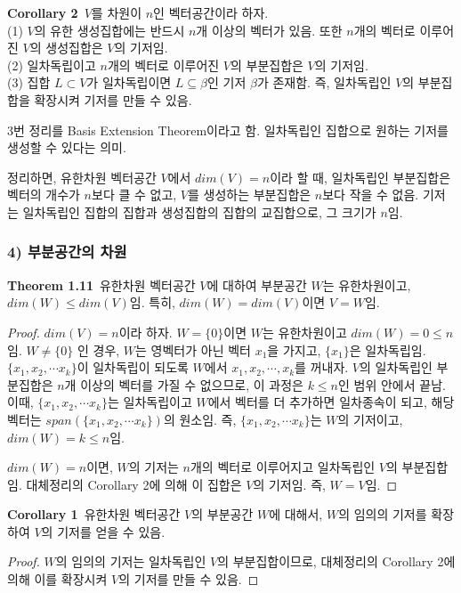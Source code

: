 \documentclass[10pt, a4paper]{article}
\begin{document}
\textbf{Corollary 2}\, $V$를 차원이 $n$인 벡터공간이라 하자.\\
(1) $V$의 유한 생성집합에는 반드시 $n$개 이상의 벡터가 있음. 또한 $n$개의 벡터로 이루어진 $V$의 생성집합은 $V$의 기저임.\\
(2) 일차독립이고 $n$개의 벡터로 이루어진 $V$의 부분집합은 $V$의 기저임.\\
(3) 집합 $L \subset V$가 일차독립이면 $L \subseteq \beta$인 기저 $\beta$가 존재함. 즉, 일차독립인 $V$의 부분집합을 확장시켜 기저를 만들 수 있음.

3번 정리를 Basis Extension Theorem이라고 함. 일차독립인 집합으로 원하는 기저를 생성할 수 있다는 의미.

정리하면, 유한차원 벡터공간 $V$에서 $dim(V)=n$이라 할 때, 일차독립인 부분집합은 벡터의 개수가 $n$보다 클 수 없고, $V$를 생성하는 부분집합은 $n$보다 작을 수 없음. 기저는 일차독립인 집합의 집합과 생성집합의 집합의 교집합으로, 그 크기가 $n$임.


\newpage


\subsubsection*{4) 부분공간의 차원}
\textbf{Theorem 1.11}\, 유한차원 벡터공간 $V$에 대하여 부분공간 $W$는 유한차원이고, $dim(W) \leq dim(V)$임. 특히, $dim(W) = dim(V)$이면 $V=W$임.

\begin{proof}
$dim(V)=n$이라 하자. $W=\{0\}$이면 $W$는 유한차원이고 $dim(W)=0 \leq n$임. $W \neq \{0\}$ 인 경우, $W$는 영벡터가 아닌 벡터 $x_1$을 가지고, $\{x_1\}$은 일차독립임. $\{x_1,x_2, \cdots x_k\}$이 일차독립이 되도록 $W$에서 $x_1,x_2, \cdots ,x_k$를 꺼내자. $V$의 일차독립인 부분집합은 $n$개 이상의 벡터를 가질 수 없으므로, 이 과정은 $k \leq n$인 범위 안에서 끝남. 이때, $\{x_1,x_2, \cdots x_k\}$는 일차독립이고 $W$에서 벡터를 더 추가하면 일차종속이 되고, 해당 벡터는 $span(\{x_1,x_2, \cdots x_k\})$의 원소임. 즉, $\{x_1,x_2, \cdots x_k\}$는 $W$의 기저이고, $dim(W)=k \leq n$임.

$dim(W)=n$이면, $W$의 기저는 $n$개의 벡터로 이루어지고 일차독립인 $V$의 부분집합임. 대체정리의 Corollary 2에 의해 이 집합은 $V$의 기저임. 즉, $W=V$임.
\end{proof}

\textbf{Corollary 1}\, 유한차원 벡터공간 $V$의 부분공간 $W$에 대해서, $W$의 임의의 기저를 확장하여 $V$의 기저를 얻을 수 있음.

\begin{proof}
$W$의 임의의 기저는 일차독립인 $V$의 부분집합이므로, 대체정리의 Corollary 2에 의해 이를 확장시켜 $V$의 기저를 만들 수 있음.
\end{proof}
\end{document}
